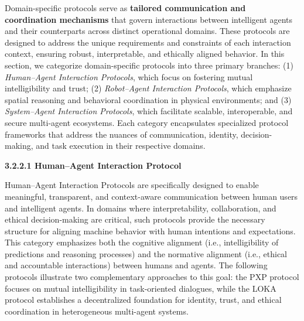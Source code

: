 \documentclass[10pt,preprint]{article}
\begin{document}
Domain-specific protocols serve as \textbf{tailored communication and coordination mechanisms} that govern interactions between intelligent agents and their counterparts across distinct operational domains. These protocols are designed to address the unique requirements and constraints of each interaction context, ensuring robust, interpretable, and ethically aligned behavior. In this section, we categorize domain-specific protocols into three primary branches: (1) \textit{Human–Agent Interaction Protocols}, which focus on fostering mutual intelligibility and trust; (2) \textit{Robot–Agent Interaction Protocols}, which emphasize spatial reasoning and behavioral coordination in physical environments; and (3) \textit{System–Agent Interaction Protocols}, which facilitate scalable, interoperable, and secure multi-agent ecosystems. Each category encapsulates specialized protocol frameworks that address the nuances of communication, identity, decision-making, and task execution in their respective domains.

\vspace{1ex}
\noindent\textbf{3.2.2.1 Human–Agent Interaction Protocol}
\vspace{1ex}

Human–Agent Interaction Protocols are specifically designed to enable meaningful, transparent, and context-aware communication between human users and intelligent agents. In domains where interpretability, collaboration, and ethical decision-making are critical, such protocols provide the necessary structure for aligning machine behavior with human intentions and expectations. This category emphasizes both the cognitive alignment (i.e., intelligibility of predictions and reasoning processes) and the normative alignment (i.e., ethical and accountable interactions) between humans and agents. The following protocols illustrate two complementary approaches to this goal: the PXP protocol focuses on mutual intelligibility in task-oriented dialogues, while the LOKA protocol establishes a decentralized foundation for identity, trust, and ethical coordination in heterogeneous multi-agent systems.
\end{document}
